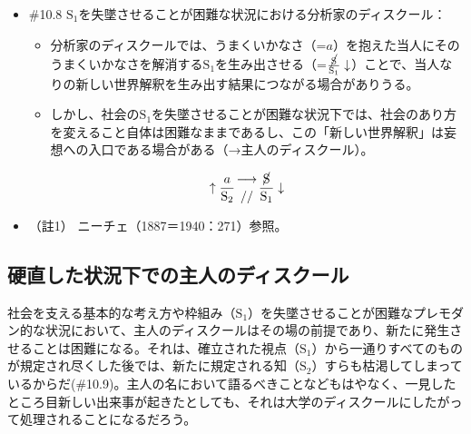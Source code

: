 \begin{note}{}
  \begin{itemize}
    \tightlist
    \item{\#10.8}
      $\textrm{S}_1$を失墜させることが困難な状況における\mbox{分析家のディスクール}：
      \begin{itemize}
          \tightlist
          \item
          \mbox{分析家のディスクール}では、うまくいかなさ（=$a$）を抱えた当人にそのうまくいかなさを解消する$\textrm{S}_1$を生み出させる（=$\frac{\cancel{\textrm{S}}}{\textrm{S}_1}\downarrow$）ことで、当人なりの新しい世界解釈を生み出す結果につながる場合がありうる。
          \item
          しかし、社会の$\textrm{S}_1$を失墜させることが困難な状況下では、社会のあり方を変えること自体は困難なままであるし、この「新しい世界解釈」は妄想への入口である場合がある（→\mbox{主人のディスクール}）。
        \end{itemize}

$$
\uparrow\frac{a}{\mathrm{S_2}}\genfrac{}{}{0pt}{}{\longrightarrow}{//}\frac{\cancel{\textrm{S}}}{\mathrm{S_1}}\downarrow
$$
  \end{itemize}
\end{note}

\begin{itemize}
\tightlist
\item
  （註1） ニーチェ（1887＝1940：271）\cite{Nietzsche2}参照。
\end{itemize}

\subsection{硬直した状況下での主人のディスクール}\label{ux786cux76f4ux3057ux305fux72b6ux6cc1ux4e0bux3067ux306eux4e3bux4ebaux306eux30c7ux30a3ux30b9ux30afux30fcux30eb}

社会を支える基本的な考え方や枠組み（\(\textrm{S}_1\)）を失墜させることが困難なプレモダン的な状況において、\mbox{主人のディスクール}はその場の前提であり、新たに発生させることは困難になる。それは、確立された視点（\(\textrm{S}_1\)）から一通りすべてのものが規定され尽くした後では、新たに規定される知（\(\textrm{S}_2\)）すらも枯渇してしまっているからだ(\#10.9)。主人の名において語るべきことなどもはやなく、一見したところ目新しい出来事が起きたとしても、それは\mbox{大学のディスクール}にしたがって処理されることになるだろう。

